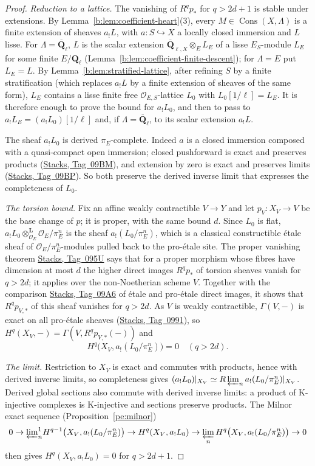 \documentclass[11pt,a4paper]{article}
\numberwithin{equation}{section}
\theoremstyle{definition}
\theoremstyle{remark}
\newcommand{\Qbar}{\overline{\mathbf Q}_\ell}
\newcommand{\Ql}{\mathbf Q_\ell}
\newcommand{\stacks}[1]{\href{https://stacks.math.columbia.edu/tag/#1}{\textnormal{Stacks, Tag~#1}}}
\newcommand{\Cons}{\operatorname{Cons}}
\newcommand{\QbarX}{\overline{\mathbf Q}_{\ell,X}}
\begin{document}
\begin{proof}
\emph{Reduction to a lattice.} The vanishing of $R^qp_*$ for $q>2d+1$ is
stable under extensions. By Lemma~\ref{b:lem:coefficient-heart}(3), every
$M\in\Cons(X,\Lambda)$ is a finite extension of sheaves $a_!L$, with
$a:S\hookrightarrow X$ a locally closed immersion and $L$ lisse. For
$\Lambda=\Qbar$, $L$ is the scalar extension $\QbarX\otimes_{E}L_E$ of a
lisse $E_S$-module $L_E$ for some finite $E/\Ql$
(Lemma~\ref{b:lem:coefficient-finite-descent}); for $\Lambda=E$ put
$L_E=L$. By Lemma~\ref{b:lem:stratified-lattice}, after refining $S$ by a
finite stratification (which replaces $a_!L$ by a finite extension of
sheaves of the same form), $L_E$ contains a lisse finite free
$\mathcal O_{E,S}$-lattice $L_0$ with $L_0[1/\ell]=L_E$. It is therefore
enough to prove the bound for $a_!L_0$, and then to pass to
$a_!L_E=(a_!L_0)[1/\ell]$ and, if $\Lambda=\Qbar$, to its scalar
extension $a_!L$.

The sheaf $a_!L_0$ is derived $\pi_E$-complete. Indeed $a$ is a closed
immersion composed with a quasi-compact open immersion; closed pushforward
is exact and preserves products (\stacks{09BM}), and extension by zero is
exact and preserves limits (\stacks{09BP}). So both preserve the derived
inverse limit that expresses the completeness of $L_0$.

\emph{The torsion bound.} Fix an affine weakly contractible $V\to Y$ and
let $p_V:X_V\to V$ be the base change of $p$; it is proper, with the same
bound $d$. Since $L_0$ is flat, $a_!L_0\otimes^{\mathbf L}_{\mathcal O_E}
\mathcal O_E/\pi_E^n$ is the sheaf $a_!(L_0/\pi_E^n)$, which is a classical
constructible \'etale sheaf of $\mathcal O_E/\pi_E^n$-modules pulled back
to the pro-\'etale site. The proper vanishing theorem \stacks{095U} says
that for a proper morphism whose fibres have dimension at most $d$ the
higher direct images $R^qp_*$ of torsion sheaves vanish for $q>2d$; it
applies over the non-Noetherian scheme $V$. Together with the comparison
\stacks{09A6} of \'etale and pro-\'etale direct images, it shows that
$R^qp_{V,*}$ of this sheaf vanishes for $q>2d$. As $V$ is weakly
contractible, $\Gamma(V,-)$ is exact on all pro-\'etale sheaves
(\stacks{0991}), so $H^q(X_V,-)=\Gamma(V,R^qp_{V,*}(-))$ and
\[
 H^q\bigl(X_V,a_!(L_0/\pi_E^n)\bigr)=0\quad(q>2d).
\]

\emph{The limit.} Restriction to $X_V$ is exact and commutes with
products, hence with derived inverse limits, so completeness gives
$(a_!L_0)|_{X_V}\simeq R\varprojlim_n a_!(L_0/\pi_E^n)|_{X_V}$.
Derived global sections also commute with derived inverse limits: a
product of K-injective complexes is K-injective and sections preserve
products. The Milnor exact sequence (Proposition~\ref{pe:milnor})
\[
 0\to{\textstyle\varprojlim^1_n}H^{q-1}\bigl(X_V,a_!(L_0/\pi_E^n)\bigr)
 \to H^q(X_V,a_!L_0)
 \to\varprojlim_nH^q\bigl(X_V,a_!(L_0/\pi_E^n)\bigr)\to0
\]
then gives $H^q(X_V,a_!L_0)=0$ for $q>2d+1$.


\end{proof}
\end{document}
